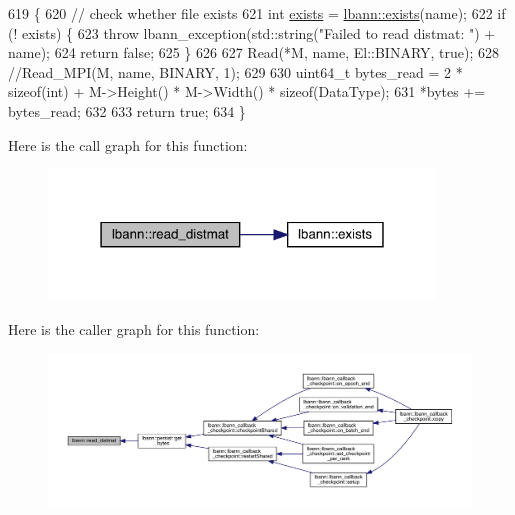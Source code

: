 \begin{DoxyCode}
619                                                                               \{
620   \textcolor{comment}{// check whether file exists}
621   \textcolor{keywordtype}{int} \hyperlink{namespacelbann_aefae2a9fc9d742ece0fa8ca7ed9ee137}{exists} = \hyperlink{namespacelbann_aefae2a9fc9d742ece0fa8ca7ed9ee137}{lbann::exists}(name);
622   \textcolor{keywordflow}{if} (! exists) \{
623     \textcolor{keywordflow}{throw} lbann\_exception(std::string(\textcolor{stringliteral}{"Failed to read distmat: "}) + name);
624     \textcolor{keywordflow}{return} \textcolor{keyword}{false};
625   \}
626 
627   Read(*M, name, El::BINARY, \textcolor{keyword}{true});
628   \textcolor{comment}{//Read\_MPI(M, name, BINARY, 1);}
629 
630   uint64\_t bytes\_read = 2 * \textcolor{keyword}{sizeof}(int) + M->Height() * M->Width() * \textcolor{keyword}{sizeof}(DataType);
631   *bytes += bytes\_read;
632 
633   \textcolor{keywordflow}{return} \textcolor{keyword}{true};
634 \}
\end{DoxyCode}
Here is the call graph for this function\+:\nopagebreak
\begin{figure}[H]
\begin{center}
\leavevmode
\includegraphics[width=291pt]{namespacelbann_a0306ed35d6d90cf4fbdce7a72ad62ca7_cgraph}
\end{center}
\end{figure}
Here is the caller graph for this function\+:\nopagebreak
\begin{figure}[H]
\begin{center}
\leavevmode
\includegraphics[width=350pt]{namespacelbann_a0306ed35d6d90cf4fbdce7a72ad62ca7_icgraph}
\end{center}
\end{figure}
\mbox{\label{namespacelbann_a66f98f36cf54dca622f1186309961dd4}} 
